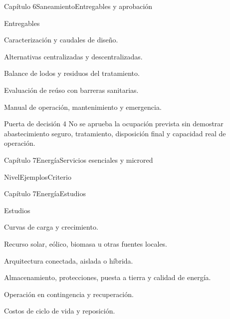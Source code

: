 \documentclass{../plantilla/hvtbook}
\begin{document}
\begin{HVTPage}{Capítulo 6}{Saneamiento}{Entregables y aprobación}
\begin{HVTTask}{Entregables}
  \item Caracterización y caudales de diseño.
  \item Alternativas centralizadas y descentralizadas.
  \item Balance de lodos y residuos del tratamiento.
  \item Evaluación de reúso con barreras sanitarias.
  \item Manual de operación, mantenimiento y emergencia.
\end{HVTTask}
\begin{HVTWarning}{Puerta de decisión 4}
No se aprueba la ocupación prevista sin demostrar abastecimiento seguro, tratamiento, disposición final y capacidad real de operación.
\end{HVTWarning}
\end{HVTPage}

\begin{HVTPage}{Capítulo 7}{Energía}{Servicios esenciales y microred}
\begin{HVTTable}{Nivel}{Ejemplos}{Criterio}
\end{HVTTable}
\end{HVTPage}

\begin{HVTPage}{Capítulo 7}{Energía}{Estudios}
\begin{HVTTask}{Estudios}
  \item Curvas de carga y crecimiento.
  \item Recurso solar, eólico, biomasa u otras fuentes locales.
  \item Arquitectura conectada, aislada o híbrida.
  \item Almacenamiento, protecciones, puesta a tierra y calidad de energía.
  \item Operación en contingencia y recuperación.
  \item Costos de ciclo de vida y reposición.
\end{HVTTask}
\end{HVTPage}
\end{document}

